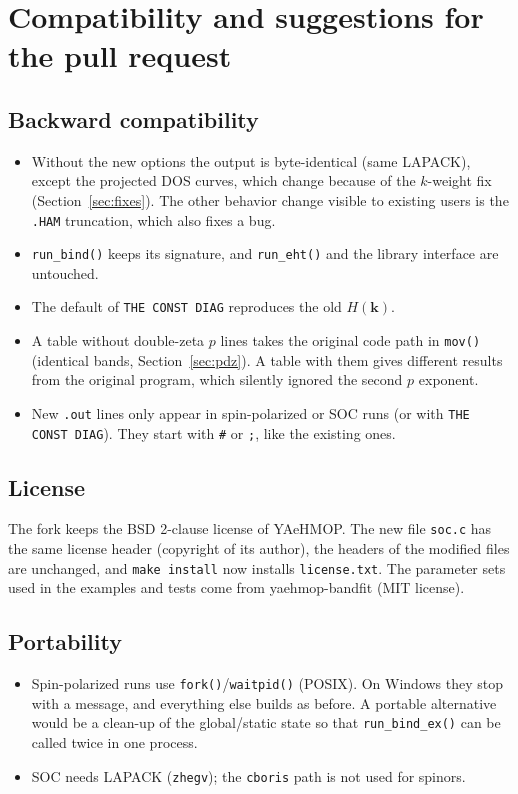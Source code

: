 \documentclass[11pt,a4paper]{article}
\newcommand{\file}[1]{\texttt{#1}}
\newcommand{\fn}[1]{\texttt{#1()}}
\begin{document}
\section{Compatibility and suggestions for the pull request}

\subsection{Backward compatibility}
\begin{itemize}
\item Without the new options the output is byte-identical (same LAPACK), except the
  projected DOS curves, which change because of the $k$-weight fix
  (Section~\ref{sec:fixes}). The other behavior change visible to existing users is the
  \texttt{.HAM} truncation, which also fixes a bug.
\item \fn{run\_bind} keeps its signature, and \fn{run\_eht} and the library interface
  are untouched.
\item The default of \texttt{THE CONST DIAG} reproduces the old $H(\mathbf{k})$.
\item A table without double-zeta $p$ lines takes the original code path in \fn{mov}
  (identical bands, Section~\ref{sec:pdz}). A table with them gives different results from
  the original program, which silently ignored the second $p$ exponent.
\item New \texttt{.out} lines only appear in spin-polarized or SOC runs (or with
  \texttt{THE CONST DIAG}). They start with \texttt{\#} or \texttt{;}, like the existing
  ones.
\end{itemize}

\subsection{License}
The fork keeps the BSD 2-clause license of YAeHMOP. The new file \file{soc.c} has the same
license header (copyright of its author), the headers of the modified files are
unchanged, and \texttt{make install} now installs \file{license.txt}. The parameter sets
used in the examples and tests come from yaehmop-bandfit (MIT license).

\subsection{Portability}
\begin{itemize}
\item Spin-polarized runs use \fn{fork}/\fn{waitpid} (POSIX). On Windows they stop with
  a message, and everything else builds as before. A portable alternative would be a
  clean-up of the global/static state so that \fn{run\_bind\_ex} can be called twice in one
  process.
\item SOC needs LAPACK (\texttt{zhegv}); the \texttt{cboris} path is not used for spinors.
\end{itemize}
\end{document}
